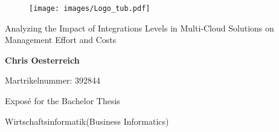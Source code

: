 
\begin{titlepage}
    
    \begin{figure}[t]
        \begin{flushright}
            \texttt{[image: images/Logo\_tub.pdf]}
        \end{flushright}
    \end{figure}

    \begin{flushleft}
    
        \vspace{5cm}
        \LARGE
        Analyzing the Impact of Integrations Levels in Multi-Cloud Solutions on Management Effort and Costs
        
        \vspace{1.5cm}
        \textbf{Chris Oesterreich}
        
        \vspace{0.5cm}
        \large
        Martrikelnummer: 392844
        
        \vspace{0.5cm}
        \Large
        Exposé for the Bachelor Thesis

        
        \vspace{0.5cm}
        Wirtschaftsinformatik(Business Informatics)
        
    \end{flushleft}        


\end{titlepage}

\restoregeometry